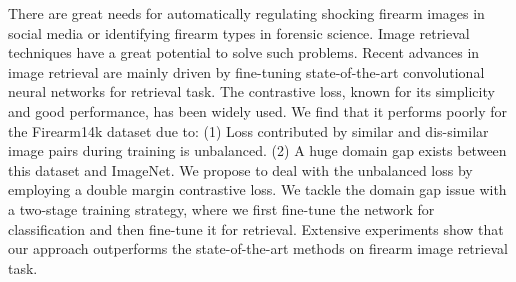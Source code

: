 \begin{enumerate}
There are great needs for automatically regulating shocking firearm images in social media or identifying firearm types in forensic science. Image retrieval techniques have a great potential to solve such problems. Recent advances in image retrieval are mainly driven by fine-tuning state-of-the-art convolutional neural networks for retrieval task. The contrastive loss, known for its simplicity and good performance, has been widely used. We find that it performs poorly for the Firearm14k dataset due to: (1) Loss contributed by similar and dis-similar image pairs during training is unbalanced. (2) A huge domain gap exists between this dataset and ImageNet. We propose to deal with the unbalanced loss by employing a double margin contrastive loss. We tackle the domain gap issue with a two-stage training strategy, where we first fine-tune the network for classification and then fine-tune it for retrieval. Extensive experiments show that our approach outperforms the state-of-the-art methods on firearm image retrieval task.

\end{enumerate}



